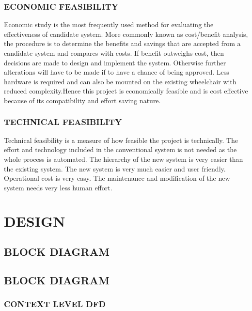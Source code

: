 \documentclass[11pt]{report} %
\begin{document}
\subsection{ECONOMIC FEASIBILITY}
\label{subsec:ECONOMIC FEASIBILITY}

Economic study is the most frequently used method for evaluating the effectiveness of candidate system. More commonly known as cost/benefit analysis, the procedure is to determine the benefits and savings that are accepted from a candidate system and compares with costs. If benefit outweighs cost, then decisions are made to design and implement the system. Otherwise further alterations will have to be made if to have a chance of being approved.
Less hardware is required and can also be mounted on the existing wheelchair with reduced complexity.Hence this project is economically feasible and is cost effective because of its compatibility and effort saving nature.


\subsection{TECHNICAL FEASIBILITY}
\label{subsec:TECHNICAL FEASIBILITY}

Technical feasibility is a measure of how feasible the project is technically. The effort and technology included in the conventional system is not needed as the whole process is automated.
The hierarchy of the new system is very easier than the existing system. The new system is very much easier and user friendly. Operational cost is very easy. The maintenance and modification of the new system needs very less human effort. 

\chapter{DESIGN}
\label{cha:DESIGN}

\section{BLOCK DIAGRAM}
\label{sec:BLOCK DIAGRAM}

\section{BLOCK DIAGRAM}
\label{sec:DATA FLOW DIAGRAMS}

\subsection{CONTEXT LEVEL DFD}
\label{subsec:CONTEXT LEVEL DFD}
\end{document}
